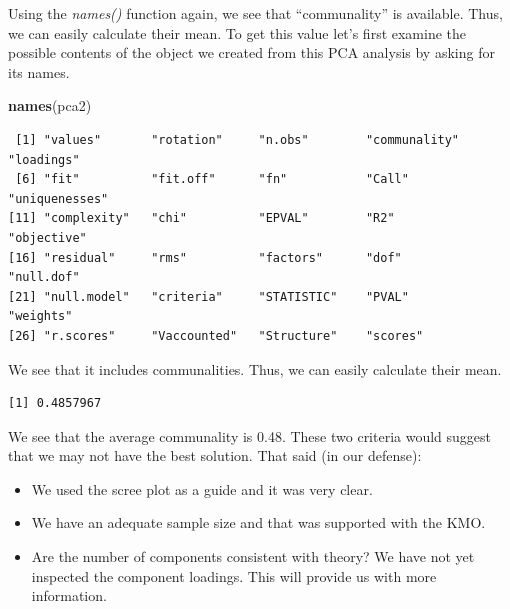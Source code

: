 \documentclass[
  english,
]{book}
\newenvironment{Shaded}{\begin{snugshade}}{\end{snugshade}}
\newcommand{\CommentTok}[1]{\textcolor[rgb]{0.56,0.35,0.01}{\textit{#1}}}
\newcommand{\KeywordTok}[1]{\textcolor[rgb]{0.13,0.29,0.53}{\textbf{#1}}}
\newcommand{\NormalTok}[1]{#1}
\newcommand{\OperatorTok}[1]{\textcolor[rgb]{0.81,0.36,0.00}{\textbf{#1}}}
\providecommand{\tightlist}{%
  \setlength{\itemsep}{0pt}\setlength{\parskip}{0pt}}
\begin{document}
Using the \emph{names()} function again, we see that ``communality'' is available. Thus, we can easily calculate their mean. To get this value let's first examine the possible contents of the object we created from this PCA analysis by asking for its names.

\begin{Shaded}
\begin{Highlighting}[]
\KeywordTok{names}\NormalTok{(pca2)}
\end{Highlighting}
\end{Shaded}

\begin{verbatim}
 [1] "values"       "rotation"     "n.obs"        "communality"  "loadings"    
 [6] "fit"          "fit.off"      "fn"           "Call"         "uniquenesses"
[11] "complexity"   "chi"          "EPVAL"        "R2"           "objective"   
[16] "residual"     "rms"          "factors"      "dof"          "null.dof"    
[21] "null.model"   "criteria"     "STATISTIC"    "PVAL"         "weights"     
[26] "r.scores"     "Vaccounted"   "Structure"    "scores"      
\end{verbatim}

We see that it includes communalities. Thus, we can easily calculate their mean.

\begin{Shaded}
\end{Shaded}

\begin{verbatim}
[1] 0.4857967
\end{verbatim}

\begin{Shaded}
\end{Shaded}

We see that the average communality is 0.48. These two criteria would suggest that we may not have the best solution. That said (in our defense):

\begin{itemize}
\tightlist
\item
  We used the scree plot as a guide and it was very clear.
\item
  We have an adequate sample size and that was supported with the KMO.
\item
  Are the number of components consistent with theory? We have not yet inspected the component loadings. This will provide us with more information.
\end{itemize}
\end{document}
